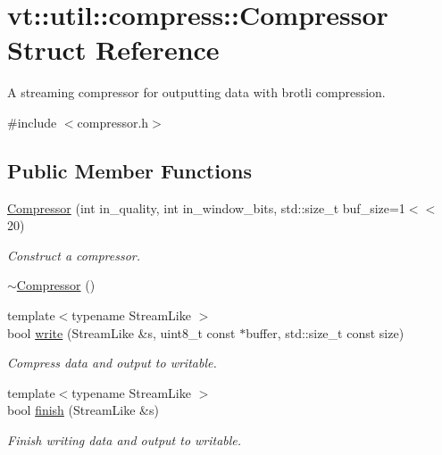 \hypertarget{structvt_1_1util_1_1compress_1_1_compressor}{}\section{vt\+:\+:util\+:\+:compress\+:\+:Compressor Struct Reference}
\label{structvt_1_1util_1_1compress_1_1_compressor}


A streaming compressor for outputting data with brotli compression.  




{\ttfamily \#include $<$compressor.\+h$>$}

\subsection*{Public Member Functions}
\begin{DoxyCompactItemize}
\item 
\hyperlink{structvt_1_1util_1_1compress_1_1_compressor_ad28fd994869ce365226477bb15d95261}{Compressor} (int in\+\_\+quality, int in\+\_\+window\+\_\+bits, std\+::size\+\_\+t buf\+\_\+size=1$<$$<$ 20)
\begin{DoxyCompactList}\small\item\em Construct a compressor. \end{DoxyCompactList}\item 
\hyperlink{structvt_1_1util_1_1compress_1_1_compressor_a0c478308c698b9637945f69184c3a2d0}{$\sim$\+Compressor} ()
\item 
{\footnotesize template$<$typename Stream\+Like $>$ }\\bool \hyperlink{structvt_1_1util_1_1compress_1_1_compressor_a6ffad58973420bf17cbd258cb49fc3c1}{write} (Stream\+Like \&s, uint8\+\_\+t const $\ast$buffer, std\+::size\+\_\+t const size)
\begin{DoxyCompactList}\small\item\em Compress data and output to writable. \end{DoxyCompactList}\item 
{\footnotesize template$<$typename Stream\+Like $>$ }\\bool \hyperlink{structvt_1_1util_1_1compress_1_1_compressor_ae5068bb65450d6e2aa3984b0cd92a41e}{finish} (Stream\+Like \&s)
\begin{DoxyCompactList}\small\item\em Finish writing data and output to writable. \end{DoxyCompactList}\end{DoxyCompactItemize}
